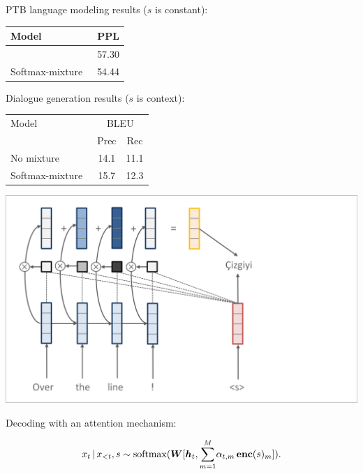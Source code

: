 \begin{frame}
PTB language modeling results ($s$ is constant):
\air
\begin{table}
\begin{tabular}{lc}
\toprule
     Model & PPL \\
\midrule     
     \citet{merity2018regularizing} & 57.30 \\
     Softmax-mixture~\citep{yang2018breaking} & 54.44 \\
\bottomrule
\end{tabular}  
\end{table}

\air
\air
        
Dialogue generation results ($s$ is context):
\air
\begin{table}
\begin{tabular}{lcc}
\toprule
     Model &  \multicolumn{2}{c}{BLEU} \\
     & Prec & Rec \\
\midrule     
     No mixture & 14.1 & 11.1 \\
     Softmax-mixture~\citep{yang2018breaking} & 15.7 & 12.3 \\
\bottomrule
\end{tabular}
\end{table}
    
\end{frame}

\begin{frame}
\begin{center}
    \includegraphics[scale=0.24]{pics/attn1step.png}
\end{center}

Decoding with an attention mechanism:

\[x_{t} \,|\, x_{< t}, s  \sim \operatorname*{softmax}(\boldsymbol{W} [\boldsymbol{h}_{t}, {\sum_{m=1}^M} \alpha_{t,m} \,  \boldsymbol{\mathrm{enc}}(s)_m]).\]



\end{frame}

